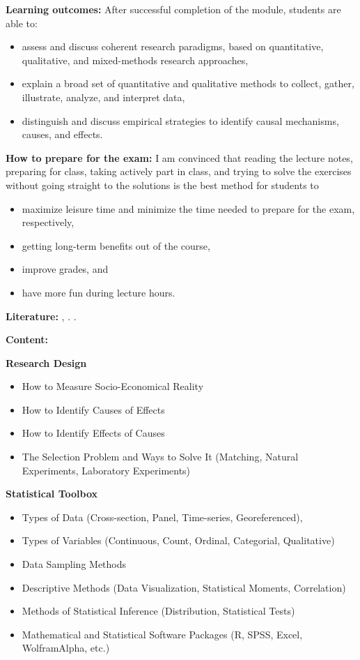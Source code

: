 \documentclass[
  12pt,
  oneside]{book}
\providecommand{\tightlist}{%
  \setlength{\itemsep}{0pt}\setlength{\parskip}{0pt}}
\theoremstyle{definition}
\theoremstyle{definition}
\theoremstyle{definition}
\theoremstyle{definition}
\theoremstyle{remark}
\begin{document}
\textbf{Learning outcomes:}
After successful completion of the module, students are able to:

\begin{itemize}
\tightlist
\item
  assess and discuss coherent research paradigms, based on quantitative, qualitative, and mixed-methods research approaches,
\item
  explain a broad set of quantitative and qualitative methods to collect, gather, illustrate, analyze, and interpret data,
\item
  distinguish and discuss empirical strategies to identify causal mechanisms, causes, and effects.
\end{itemize}

\textbf{How to prepare for the exam:}
I am convinced that reading the lecture notes, preparing for class, taking actively part in class, and trying to solve the exercises without going straight to the solutions is the best method for students to

\begin{itemize}
\tightlist
\item
  maximize leisure time and minimize the time needed to prepare for the exam, respectively,
\item
  getting long-term benefits out of the course,
\item
  improve grades, and
\item
  have more fun during lecture hours.
\end{itemize}

\textbf{Literature:}
\citet{Cunningham2021Causal}, \citet{Huntington-Klein2022Effect}. \citet{Illowsky2018Introductory}. \citet{Bekes2021Data}

\textbf{Content:}

\textbf{Research Design}

\begin{itemize}
\tightlist
\item
  How to Measure Socio-Economical Reality
\item
  How to Identify Causes of Effects
\item
  How to Identify Effects of Causes
\item
  The Selection Problem and Ways to Solve It (Matching, Natural Experiments, Laboratory Experiments)
\end{itemize}

\textbf{Statistical Toolbox}

\begin{itemize}
\tightlist
\item
  Types of Data (Cross-section, Panel, Time-series, Georeferenced),
\item
  Types of Variables (Continuous, Count, Ordinal, Categorial, Qualitative)
\item
  Data Sampling Methods
\item
  Descriptive Methods (Data Visualization, Statistical Moments, Correlation)
\item
  Methods of Statistical Inference (Distribution, Statistical Tests)
\item
  Mathematical and Statistical Software Packages (R, SPSS, Excel, WolframAlpha, etc.)
\end{itemize}
\end{document}
